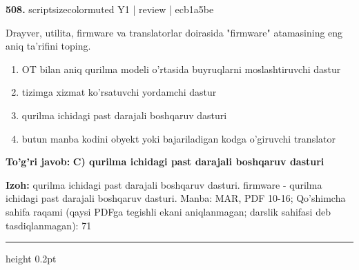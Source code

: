 \documentclass[10pt,a4paper]{article}
\begin{document}
{\bfseries\sffamily\color{ink} 508.} {scriptsizecolor{muted} Y1 | review | ecb1a5be}
\par
Drayver, utilita, firmware va translatorlar doirasida "firmware" atamasining eng aniq ta'rifini toping.
\begin{enumerate}[label=\Alph*),leftmargin=9mm]
\item OT bilan aniq qurilma modeli o'rtasida buyruqlarni moslashtiruvchi dastur
\item tizimga xizmat ko'rsatuvchi yordamchi dastur
\item qurilma ichidagi past darajali boshqaruv dasturi
\item butun manba kodini obyekt yoki bajariladigan kodga o'giruvchi translator
\end{enumerate}
\begin{tcolorbox}[enhanced,breakable,colback=teal!4,colframe=teal!60!black,boxrule=0.45pt,arc=1.2mm,left=2.7mm,right=2.7mm,top=1.8mm,bottom=1.8mm,before skip=2mm,after skip=2mm]
{\bfseries\sffamily\color{teal}To'g'ri javob:} \textbf{C) qurilma ichidagi past darajali boshqaruv dasturi}
\par\smallskip
{\bfseries Izoh:} qurilma ichidagi past darajali boshqaruv dasturi. firmware - qurilma ichidagi past darajali boshqaruv dasturi. Manba: MAR, PDF 10-16; Qo'shimcha sahifa raqami (qaysi PDFga tegishli ekani aniqlanmagan; darslik sahifasi deb tasdiqlanmagan): 71
\end{tcolorbox}
\vspace{2mm}\hrule height 0.2pt\vspace{3mm}
\end{document}

